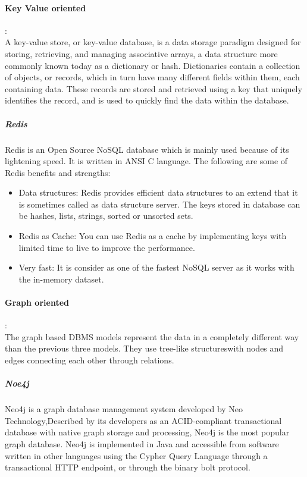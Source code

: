 \paragraph{Key Value oriented } :\\
\label{sec:sec01}
A key-value store, or key-value database, is a data storage paradigm designed for storing, 
retrieving, and managing associative arrays, a data structure more commonly 
known today as a dictionary or hash. Dictionaries contain a collection of objects, 
or records, which in turn have many different fields within them, each containing data. 
These records are stored and retrieved using a key that uniquely identifies the record, 
and is used to quickly find the data within the database.
\subparagraph{Redis} 
\label{sec:sec01}
Redis is an Open Source NoSQL database which is mainly used because of its lightening speed. It is written in ANSI C language. The following are some of Redis benefits and strengths:
 \begin{itemize}
  \item Data structures: Redis provides efficient data structures to an extend that it is sometimes called as data structure server. The keys stored in database can be hashes, lists, strings, sorted or unsorted sets.
  \item Redis as Cache: You can use Redis as a cache by implementing keys with limited time to live to improve the performance.
  \item Very fast: It is consider as one of the fastest NoSQL server as it works with the in-memory dataset.
\end{itemize}



\paragraph{Graph oriented} :\\
\label{sec:sec01}
The graph based DBMS models represent the data in a completely different way than the previous three models.
 They use tree-like structureswith nodes and edges connecting each other through relations.
\subparagraph{Noe4j} 
\label{sec:sec01}
Neo4j is a graph database management system developed by Neo Technology,Described by its 
developers as an ACID-compliant transactional database with native graph storage and processing,
Neo4j is the most popular graph database.
Neo4j is implemented in Java and accessible 
from software written in other languages using the Cypher 
Query Language through a transactional HTTP endpoint, or through the binary bolt protocol.


